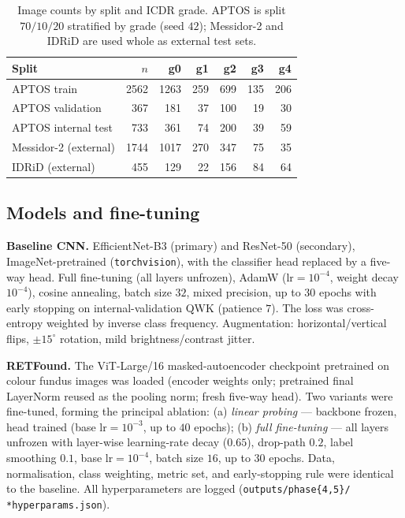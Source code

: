 \documentclass[journal]{IEEEtran}
\renewcommand{\_}{\origunderscore\allowbreak}
\begin{document}
\begin{table}[!t]
\centering\small
\caption{Image counts by split and ICDR grade. APTOS is split
$70/10/20$ stratified by grade (seed $42$); Messidor-2 and IDRiD are used whole
as external test sets.}
\label{tab:counts}
\setlength{\tabcolsep}{4pt}
\begin{tabular}{lrrrrrr}
\toprule
Split & $n$ & g0 & g1 & g2 & g3 & g4 \\
\midrule
APTOS train & 2562 & 1263 & 259 & 699 & 135 & 206 \\
APTOS validation & 367 & 181 & 37 & 100 & 19 & 30 \\
APTOS internal test & 733 & 361 & 74 & 200 & 39 & 59 \\
\midrule
Messidor-2 (external) & 1744 & 1017 & 270 & 347 & 75 & 35 \\
IDRiD (external) & 455 & 129 & 22 & 156 & 84 & 64 \\
\bottomrule
\end{tabular}
\end{table}

\subsection{Models and fine-tuning}
\label{sec:methods-models}

\textbf{Baseline CNN.} EfficientNet-B3 \cite{tan2019efficientnet} (primary) and
ResNet-50 \cite{he2016resnet} (secondary), ImageNet-pretrained
(\texttt{torchvision}), with the classifier head replaced by a five-way head.
Full fine-tuning (all layers unfrozen), AdamW ($\text{lr}=10^{-4}$, weight decay
$10^{-4}$), cosine annealing, batch size $32$, mixed precision, up to $30$ epochs
with early stopping on internal-validation QWK (patience $7$). The loss was
cross-entropy weighted by inverse class frequency. Augmentation:
horizontal/vertical flips, $\pm15^{\circ}$ rotation, mild brightness/contrast
jitter.

\textbf{RETFound.} The ViT-Large/16 masked-autoencoder checkpoint pretrained on
colour fundus images \cite{zhou2023retfound} was loaded (encoder weights only;
pretrained final LayerNorm reused as the pooling norm; fresh five-way head). Two
variants were fine-tuned, forming the principal ablation: (a) \emph{linear
probing} --- backbone frozen, head trained (base $\text{lr}=10^{-3}$, up to $40$
epochs); (b) \emph{full fine-tuning} --- all layers unfrozen with layer-wise
learning-rate decay ($0.65$), drop-path $0.2$, label smoothing $0.1$, base
$\text{lr}=10^{-4}$, batch size $16$, up to $30$ epochs. Data, normalisation,
class weighting, metric set, and early-stopping rule were identical to the
baseline. All hyperparameters are logged
(\texttt{outputs/\allowbreak{}phase\{4,5\}\_*/\allowbreak{}\,*\_hyperparams.json}).
\end{document}
